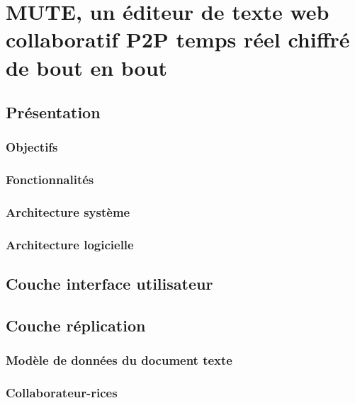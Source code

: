 \NumberThisInToc
\chapter{MUTE, un éditeur de texte web collaboratif P2P temps réel chiffré de bout en bout}
\minitoc
\label{chap:mute}



\section{Présentation}
% 

\subsection{Objectifs}


\subsection{Fonctionnalités}


\subsection{Architecture système}


\subsection{Architecture logicielle}


\section{Couche interface utilisateur}


\section{Couche réplication}
\label{sec:mute-replication}

\subsection{Modèle de données du document texte}


\subsection{Collaborateur-rices}


